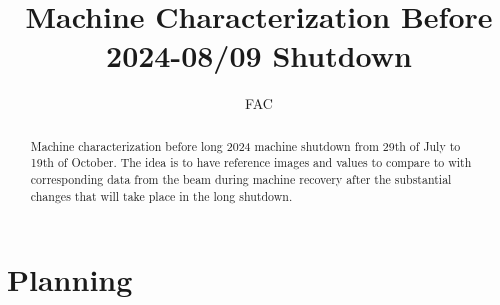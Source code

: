 \documentclass{article}
\title{Machine Characterization Before 2024-08/09 Shutdown}
\author{FAC}
\begin{document}
\maketitle

\begin{abstract}
Machine characterization before long 2024 machine shutdown from 29th of July to 19th of October. The idea is to have reference images and values to compare to with corresponding data from the beam during machine recovery after the substantial changes that will take place in the long shutdown.
\end{abstract}

\section{Planning}
\end{document}
